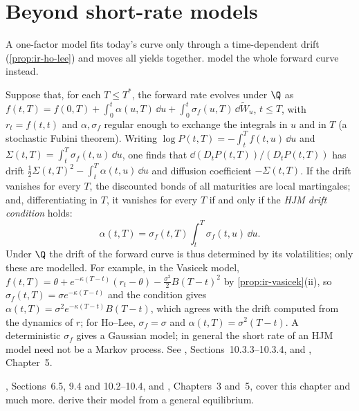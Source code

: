 
\section{Beyond short-rate models}\label{sec:ir-hjm}

A one-factor model fits today's curve only through a time-dependent drift (\cref{prop:ir-ho-lee}) and
moves all yields together. \textcite{heath-jarrow-morton-1992} model the whole forward curve instead.

\begin{remark}\label{rem:ir-hjm}
Suppose that, for each $T\le T^*$, the forward rate evolves under $\Q$ as
$f(t,T)=f(0,T)+\int_0^t\alpha(u,T)\,\dd u+\int_0^t\sigma_f(u,T)\,\dd\widetilde W_u$, $t\le T$, with $r_t=f(t,t)$ and $\alpha,\sigma_f$ regular enough to exchange the integrals in $u$ and in $T$
(a stochastic Fubini theorem). Writing $\log P(t,T)=-\int_t^Tf(t,u)\,\dd u$ and
$\Sigma(t,T)=\int_t^T\sigma_f(t,u)\,\dd u$, one finds that $\dd(D_tP(t,T))/(D_tP(t,T))$ has drift
$\frac12\Sigma(t,T)^2-\int_t^T\alpha(t,u)\,\dd u$ and diffusion coefficient $-\Sigma(t,T)$. If the drift vanishes for every $T$, the discounted bonds of all maturities are local martingales;
and, differentiating in $T$, it vanishes for every $T$ if and only if the \emph{HJM drift condition}
holds:
\[
  \alpha(t,T)=\sigma_f(t,T)\int_t^T\sigma_f(t,u)\,\dd u .
\]
Under $\Q$ the drift of the forward curve is thus determined by its volatilities; only these are
modelled. For example, in the Vasicek model, $f(t,T)=\theta+e^{-\kappa(T-t)}(r_t-\theta)-\frac{\sigma^2}2B(T-t)^2$
by \cref{prop:ir-vasicek}(ii), so $\sigma_f(t,T)=\sigma e^{-\kappa(T-t)}$ and the condition gives
$\alpha(t,T)=\sigma^2e^{-\kappa(T-t)}B(T-t)$, which agrees with the drift computed from the dynamics of
$r$; for Ho--Lee, $\sigma_f=\sigma$ and $\alpha(t,T)=\sigma^2(T-t)$. A deterministic $\sigma_f$ gives a
Gaussian model; in general the short rate of an HJM model need not be a Markov process.
See \textcite{shreve2}, Sections~10.3.3--10.3.4, and \textcite{brigo-mercurio-2006}, Chapter~5.
\end{remark}

\furtherreading
\textcite{shreve2}, Sections~6.5, 9.4 and 10.2--10.4, and \textcite{brigo-mercurio-2006}, Chapters~3
and~5, cover this chapter and much more. \textcite{cox-ingersoll-ross-1985} derive their model from a
general equilibrium.

